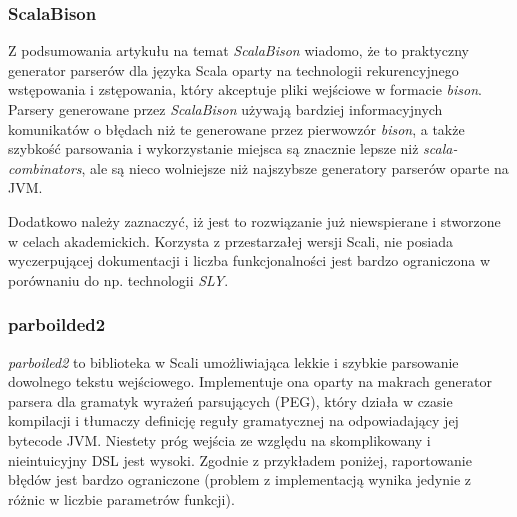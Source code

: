 \subsubsection{ScalaBison}
\label{subsubsec:scala-bison}

Z podsumowania artykułu na temat \textit{ScalaBison}\cite{boyland2010tool} wiadomo, że to praktyczny generator parserów dla języka Scala oparty na technologii rekurencyjnego wstępowania i zstępowania, który akceptuje pliki wejściowe w formacie \textit{bison}. Parsery generowane przez \textit{ScalaBison} używają bardziej informacyjnych komunikatów o błędach niż te generowane przez pierwowzór \textit{bison}, a także szybkość parsowania i wykorzystanie miejsca są znacznie lepsze niż \textit{scala-combinators}, ale są nieco wolniejsze niż najszybsze generatory parserów oparte na JVM.

Dodatkowo należy zaznaczyć, iż jest to rozwiązanie już niewspierane i stworzone w celach akademickich.
Korzysta z przestarzałej wersji Scali, nie posiada wyczerpującej dokumentacji i liczba funkcjonalności jest bardzo ograniczona w porównaniu do np. technologii \textit{SLY}.

\subsubsection{parboilded2}
\label{subsubsec:parboiled-2}

\textit{parboiled2}\cite{myltsev2019parboiled2} to biblioteka w Scali umożliwiająca lekkie i szybkie parsowanie dowolnego tekstu wejściowego.
Implementuje ona oparty na makrach generator parsera dla gramatyk wyrażeń parsujących (PEG), który działa w czasie kompilacji i tłumaczy definicję reguły gramatycznej na odpowiadający jej bytecode JVM. Niestety próg wejścia ze względu na skomplikowany i nieintuicyjny DSL jest wysoki.
Zgodnie z przykładem poniżej, raportowanie błędów jest bardzo ograniczone (problem z implementacją wynika jedynie z różnic w liczbie parametrów funkcji).

